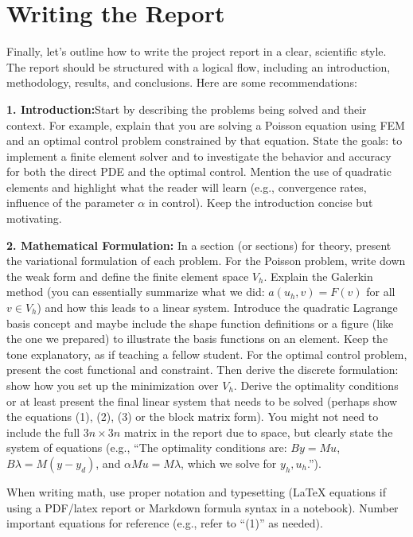 \documentclass[a4paper,10pt]{article}
\begin{document}
\section{Writing the Report}

Finally, let's outline how to write the project report in a clear, scientific style. The report should be structured with a logical flow, including an introduction, methodology, results, and conclusions. Here are some recommendations:

\textbf{1. Introduction:}Start by describing the problems being solved and their context. For example, explain that you are solving a Poisson equation using FEM and an optimal control problem constrained by that equation. State the goals: to implement a finite element solver and to investigate the behavior and accuracy for both the direct PDE and the optimal control. Mention the use of quadratic elements and highlight what the reader will learn (e.g., convergence rates, influence of the parameter \(\alpha\) in control). Keep the introduction concise but motivating.

\textbf{2. Mathematical Formulation:}
In a section (or sections) for theory, present the variational formulation of each problem. For the Poisson problem, write down the weak form and define the finite element space \(V_h\).
Explain the Galerkin method (you can essentially summarize what we did: \(a(u_h,v)=F(v)\) for all \(v\in V_h\)) and how this leads to a linear system. Introduce the quadratic Lagrange basis concept and maybe include the shape function definitions or a figure (like the one we prepared) to illustrate the basis functions on an element. Keep the tone explanatory, as if teaching a fellow student. For the optimal control problem, present the cost functional and constraint.
Then derive the discrete formulation: show how you set up the minimization over \(V_h\).
Derive the optimality conditions or at least present the final linear system that needs to be solved (perhaps show the equations (1), (2), (3) or the block matrix form). You might not need to include the full \(3n \times 3n\) matrix in the report due to space, but clearly state the system of equations (e.g., “The optimality conditions are: \(B y = M u\), \(B \lambda = M(y - y_d)\), and \(\alpha M u = M \lambda\), which we solve for \(y_h, u_h\).”).

When writing math, use proper notation and typesetting (LaTeX equations if using a PDF/latex report or Markdown formula syntax in a notebook). Number important equations for reference (e.g., refer to “(1)” as needed).
\end{document}
